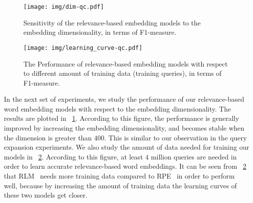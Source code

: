 \documentclass[sigconf]{acmart}
\begin{document}
\begin{figure}[t]
    \centering
    \vspace{-0.5cm}
    \texttt{[image: img/dim-qc.pdf]}\vspace{-0.3cm}
    \caption{Sensitivity of the relevance-based embedding models to the embedding dimensionality, in terms of F1-measure.}
    \vspace{-0.4cm}
    \label{fig:dim-qc}
\end{figure}

\begin{figure}[t]
\vspace{-0.5cm}
    \centering
    \texttt{[image: img/learning\_curve-qc.pdf]}\vspace{-0.3cm}
    \caption{The Performance of relevance-based embedding models with respect to different amount of training data (training queries), in terms of F1-measure.}
    \vspace{-0.4cm}
    \label{fig:lcurve-qc}
\end{figure}

In the next set of experiments, we study the performance of our relevance-based word embedding models with respect to the embedding dimensionality. The results are plotted in \figurename~\ref{fig:dim-qc}. According to this figure, the performance is generally improved by increasing the embedding dimensionality, and becomes stable when the dimension is greater than $400$. This is similar to our observation in the query expansion experiments. We also study the amount of data needed for training our models in \figurename~\ref{fig:lcurve-qc}. According to this figure, at least $4$ million queries are needed in order to learn accurate relevance-based word embeddings. It can be seen from \figurename~\ref{fig:lcurve-qc} that {RLM~} needs more training data compared to {RPE~} in order to perform well, because by increasing the amount of training data the learning curves of these two models get closer. 

\vspace{-0.1cm}
\end{document}
